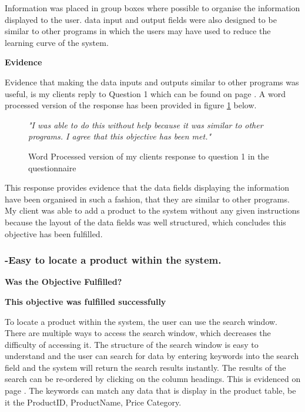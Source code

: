 Information was placed in group boxes where possible to organise the information displayed to the user. data input and output fields were also designed to be similar to other programs in which the users may have used to reduce the learning curve of the system. 


\textbf{Evidence} \newline

Evidence that making the data inputs and outputs similar to other programs was useful, is my clients reply to Question 1 which can be found on page \pageref{Client-Q1}. A word processed version of the response has been provided in figure \ref{client-evidence-Q1} below. \newline

\begin{figure}[H]
\caption{Word Processed version of my clients response to question 1 in the questionnaire} \label{client-evidence-Q1}
\vspace{3mm}
\textit{\large{"I was able to do this without help because it was similar to other programs. I agree that this objective has been met."}}
\vspace{3mm}
\end{figure}

This response provides evidence that the data fields displaying the information have been organised in such a fashion, that they are similar to other programs. My client was able to add a product to the system without any given instructions because the layout of the data fields was well structured, which concludes this objective has been fulfilled.



\pagebreak
\subsubsection{-Easy to locate a product within the system.}
\textbf{Was the Objective Fulfilled?} \newline

\textbf{\large{This objective was fulfilled successfully}}

To locate a product within the system, the user can use the search window. There are multiple ways to access the search window, which decreases the difficulty of accessing it. The structure of the search window is easy to understand and the user can search for data by entering keywords into the search field and the system will return the search results instantly. The results of the search can be re-ordered by clicking on the column headings. This is evidenced on page \pageref{}. The keywords can match any data that is display in the product table, be it the ProductID, ProductName, Price Category.\newline

